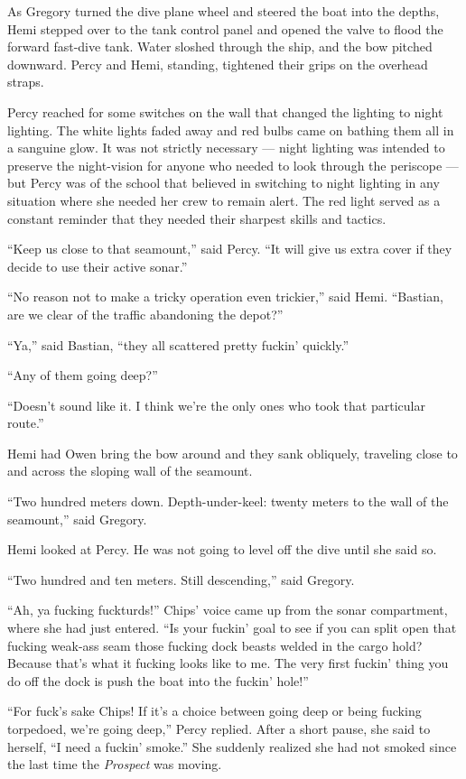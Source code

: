 \documentclass[
]{scrbook}
\begin{document}
As Gregory turned the dive plane wheel and steered the boat into the
depths, Hemi stepped over to the tank control panel and opened the valve
to flood the forward fast-dive tank. Water sloshed through the ship, and
the bow pitched downward. Percy and Hemi, standing, tightened their
grips on the overhead straps.

Percy reached for some switches on the wall that changed the lighting to
night lighting. The white lights faded away and red bulbs came on
bathing them all in a sanguine glow. It was not strictly necessary ---
night lighting was intended to preserve the night-vision for anyone who
needed to look through the periscope --- but Percy was of the school
that believed in switching to night lighting in any situation where she
needed her crew to remain alert. The red light served as a constant
reminder that they needed their sharpest skills and tactics.

``Keep us close to that seamount,'' said Percy. ``It will give us extra
cover if they decide to use their active sonar.''

``No reason not to make a tricky operation even trickier,'' said Hemi.
``Bastian, are we clear of the traffic abandoning the depot?''

``Ya,'' said Bastian, ``they all scattered pretty fuckin' quickly.''

``Any of them going deep?''

``Doesn't sound like it. I think we're the only ones who took that
particular route.''

Hemi had Owen bring the bow around and they sank obliquely, traveling
close to and across the sloping wall of the seamount.

``Two hundred meters down. Depth-under-keel: twenty meters to the wall
of the seamount,'' said Gregory.

Hemi looked at Percy. He was not going to level off the dive until she
said so.

``Two hundred and ten meters. Still descending,'' said Gregory.

``Ah, ya fucking fuckturds!'' Chips' voice came up from the sonar
compartment, where she had just entered. ``Is your fuckin' goal to see
if you can split open that fucking weak-ass seam those fucking dock
beasts welded in the cargo hold? Because that's what it fucking looks
like to me. The very first fuckin' thing you do off the dock is push the
boat into the fuckin' hole!''

``For fuck's sake Chips! If it's a choice between going deep or being
fucking torpedoed, we're going deep,'' Percy replied. After a short
pause, she said to herself, ``I need a fuckin' smoke.'' She suddenly
realized she had not smoked since the last time the \emph{Prospect} was
moving.
\end{document}

